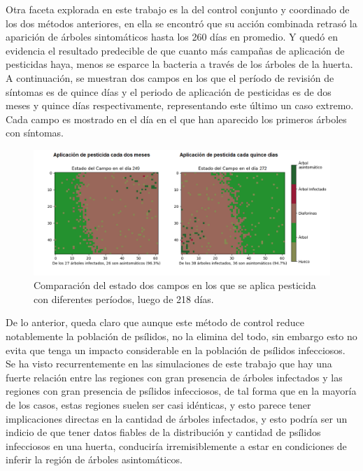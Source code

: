 Otra faceta explorada en este trabajo es la del control conjunto y coordinado de los dos métodos anteriores, en ella se encontró que su acción combinada retrasó la aparición de árboles sintomáticos hasta los 260 días en promedio. Y quedó en evidencia el resultado predecible de que cuanto más campañas de aplicación de pesticidas haya, menos se esparce la bacteria a través de los árboles de la huerta. A continuación, se muestran dos campos en los que el período de revisión de síntomas es de quince días y el periodo de aplicación de pesticidas es de dos meses y quince días respectivamente, representando este último un caso extremo. Cada campo es mostrado en el día en el que han aparecido los primeros árboles con síntomas.
\begin{figure}[H]
\centering
\includegraphics[width=1\textwidth,keepaspectratio=true]{images/Imágenes C6/C6-2.png}
\caption{Comparación del estado dos campos en los que se aplica pesticida con diferentes períodos, luego de 218 días.}
\end{figure}


De lo anterior, queda claro que aunque este método de control reduce notablemente la población de psílidos, no la elimina del todo, sin embargo esto no evita que tenga un impacto considerable en la población de psílidos infecciosos. Se ha visto recurrentemente en las simulaciones de este trabajo que hay una fuerte relación entre las regiones con gran presencia de árboles infectados y las regiones con gran presencia de psílidos infecciosos, de tal forma que en la mayoría de los casos, estas regiones suelen ser casi idénticas, y esto parece tener implicaciones directas en la cantidad de árboles infectados, y esto podría ser un indicio de que tener datos fiables de la distribución y cantidad de psílidos infecciosos en una huerta, conduciría irremisiblemente a estar en condiciones de inferir la región de árboles asintomáticos.

